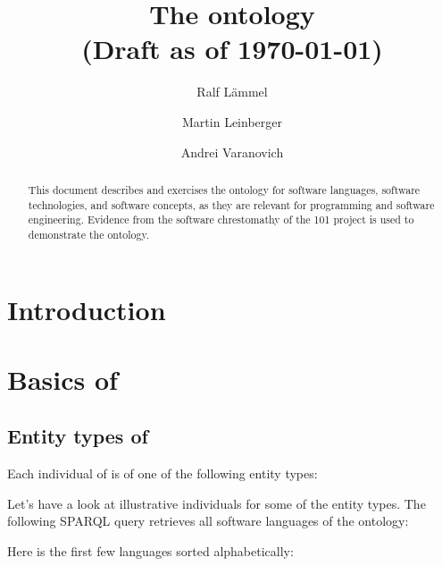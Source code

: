 \documentclass{llncs}
\title{The \solasote{} ontology\\
(Draft as of \today)}
\author{Ralf L\"ammel \and Martin Leinberger \and Andrei Varanovich}
\institute{Fachbereich Informatik, Universit\"at Koblenz-Landau, Germany}
\begin{document}
\maketitle

\begin{abstract}
  This document describes and exercises the \solasote{} ontology for
  software languages, software technologies, and software concepts, as
  they are relevant for programming and software engineering. Evidence
  from the software chrestomathy of the 101 project is used to
  demonstrate the ontology.
\end{abstract}


\section{Introduction}



\section{Basics of \solasote}

\subsection{Entity types of \solasote}

Each individual of \solasote{} is of one of the following entity
types:






Let's have a look at illustrative individuals for some of the entity
types. The following SPARQL query retrieves all software languages of
the ontology:



\noindent
Here is the first few languages sorted alphabetically:
\end{document}
